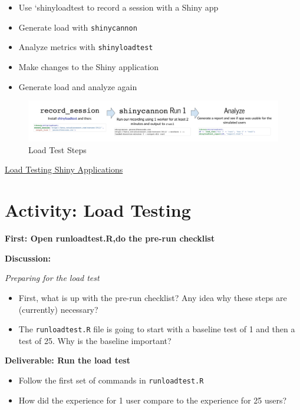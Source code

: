 \documentclass[]{book}
\providecommand{\tightlist}{%
  \setlength{\itemsep}{0pt}\setlength{\parskip}{0pt}}
\theoremstyle{definition}
\theoremstyle{definition}
\theoremstyle{definition}
\theoremstyle{remark}
\begin{document}
\begin{itemize}
\tightlist
\item
  Use `shinyloadtest to record a session with a Shiny app
\item
  Generate load with \texttt{shinycannon}
\item
  Analyze metrics with \texttt{shinyloadtest}
\item
  Make changes to the Shiny application
\item
  Generate load and analyze again
\end{itemize}

\begin{figure}
\centering
\includegraphics{imgs/loadtesting/loadtest-steps.png}
\caption{Load Test Steps}
\end{figure}

\href{https://rstudio.github.io/shinyloadtest/index.html}{Load Testing
Shiny Applications}

\hypertarget{activity-load-testing}{%
\section{Activity: Load Testing}\label{activity-load-testing}}

\textbf{First: Open runloadtest.R,do the pre-run checklist}

\textbf{Discussion:}

\emph{Preparing for the load test}

\begin{itemize}
\tightlist
\item
  First, what is up with the pre-run checklist? Any idea why these steps
  are (currently) necessary?
\item
  The \texttt{runloadtest.R} file is going to start with a baseline test
  of 1 and then a test of 25. Why is the baseline important?
\end{itemize}

\textbf{Deliverable: Run the load test}

\begin{itemize}
\tightlist
\item
  Follow the first set of commands in \texttt{runloadtest.R}
\item
  How did the experience for 1 user compare to the experience for 25
  users?
\end{itemize}
\end{document}
